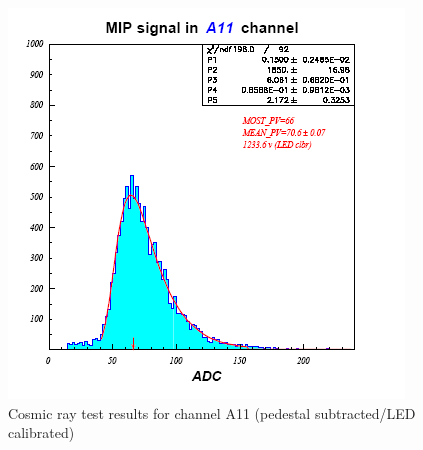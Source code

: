 \begin{figure}[h]
\centering
\includegraphics[width=0.9\linewidth]{images/Fig13_CosmicsA11.png}
\caption{Cosmic ray test results for channel A11 (pedestal subtracted/LED calibrated)}
\label{fig:CosmicsA11}
\end{figure}
